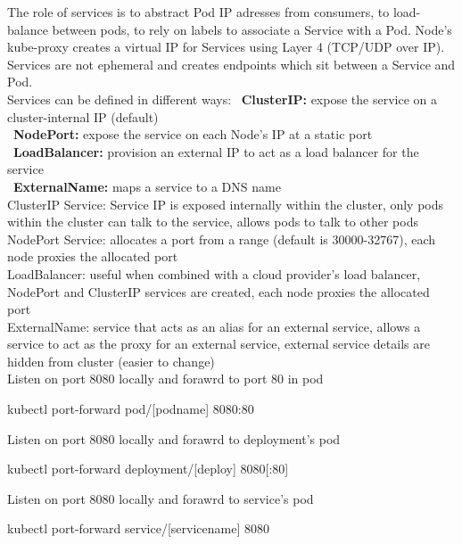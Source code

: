 \documentclass{refcard}
\begin{document}
The role of services is to abstract Pod IP adresses from consumers, to load-balance between pods, to rely on labels to associate a Service with a Pod. Node's kube-proxy creates a virtual IP for Services using Layer 4 (TCP/UDP over IP). Services are not ephemeral and creates endpoints which sit between a Service and Pod.\\

Services can be defined in different ways:
\textbullet\ \textbf{ClusterIP:} expose the service on a cluster-internal IP (default)\\
\textbullet\ \textbf{NodePort:} expose the service on each Node's IP at a static port\\
\textbullet\ \textbf{LoadBalancer:} provision an external IP to act as a load balancer for the service\\
\textbullet\ \textbf{ExternalName:} maps a service to a DNS name\\

ClusterIP Service: Service IP is exposed internally within the cluster, only pods within the cluster can talk to the service, allows pods to talk to other pods\\

NodePort Service: allocates a port from a range (default is 30000-32767), each node proxies the allocated port\\

LoadBalancer: useful when combined with a cloud provider's load balancer, NodePort and ClusterIP services are created, each node proxies the allocated port\\

ExternalName: service that acts as an alias for an external service, allows a service to act as the proxy for an external service, external service details are hidden from cluster (easier to change)\\

Listen on port 8080 locally and forawrd to port 80 in pod
\begin{ttyenv}
kubectl port-forward pod/[podname] 8080:80
\end{ttyenv}

Listen on port 8080 locally and forawrd to deployment's pod
\begin{ttyenv}
kubectl port-forward deployment/[deploy] 8080[:80]
\end{ttyenv}

Listen on port 8080 locally and forawrd to service's pod
\begin{ttyenv}
kubectl port-forward service/[servicename] 8080
\end{ttyenv}
\end{document}
